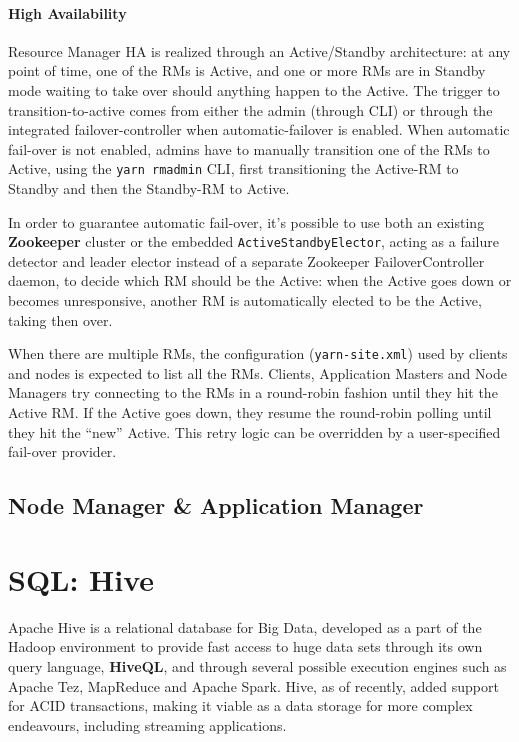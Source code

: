 \paragraph{High Availability} Resource Manager HA is realized through an Active/Standby architecture: at any point of time, one of the RMs is Active, and one or more RMs are in Standby mode waiting to take over should anything happen to the Active. The trigger to transition-to-active comes from either the admin (through CLI) or through the integrated failover-controller when automatic-failover is enabled. When automatic fail-over is not enabled, admins have to manually transition one of the RMs to Active, using the \verb|yarn rmadmin| CLI, first transitioning the Active-RM to Standby and then the Standby-RM to Active.

In order to guarantee automatic fail-over, it's possible to use both an existing \textbf{Zookeeper} cluster or the embedded \verb|ActiveStandbyElector|, acting as a failure detector and leader elector instead of a separate Zookeeper FailoverController daemon, to decide which RM should be the Active: when the Active goes down or becomes unresponsive, another RM is automatically elected to be the Active, taking then over.

When there are multiple RMs, the configuration (\verb|yarn-site.xml|) used by clients and nodes is expected to list all the RMs. Clients, Application Masters and Node Managers try connecting to the RMs in a round-robin fashion until they hit the Active RM. If the Active goes down, they resume the round-robin polling until they hit the “new” Active. This retry logic can be overridden by a user-specified fail-over provider.

\subsection{Node Manager \& Application Manager}

\pagebreak
\section{SQL: Hive}

Apache Hive is a relational database for Big Data, developed as a part of the Hadoop environment to provide fast access to huge data sets through its own query language, \textbf{HiveQL}, and through several possible execution engines such as Apache Tez, MapReduce and Apache Spark. Hive, as of recently, added  support for ACID transactions, making it viable as a data storage for more complex endeavours, including streaming applications.

